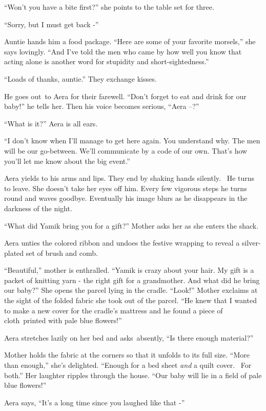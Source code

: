 \documentclass[twoside,11pt]{book}
\begin{document}
``Won't you have a bite first?'' she points to the table set for three. 

``Sorry, but I must get back -'' 

Auntie hands him a food package. ``Here are some of your favorite morsels,'' she says
lovingly. ``And I've told the men who came by how well you know that acting alone is another word for
stupidity and short-sightedness.'' 

``Loads of thanks, auntie.'' They exchange kisses. 

He goes out{\ }to Aera for their farewell. ``Don't forget to eat and drink for our
baby!'' he tells her. Then his voice becomes serious, ``Aera --?''

``What is it?'' Aera is all ears.

``I don't know when I'll manage to get here again. You understand why. The men will be our go-between.
We'll communicate by a code of our own. That's how you'll let me know about the big event.'' 

Aera yields to his arms and lips. They end by shaking hands silently. ~He turns to leave. She doesn't take her eyes off
him. Every few vigorous steps he turns round and waves goodbye. Eventually his image blurs as he disappears in the
darkness of the night. 

``What did Yamik bring you for a gift?'' Mother asks her as she enters the shack. 

Aera unties the colored ribbon and undoes the festive wrapping to reveal a silver-plated set of brush and comb.\ 

``Beautiful,'' mother is enthralled. ``Yamik is crazy about your hair. My gift is
a packet of knitting yarn - the right gift for a grandmother. And what did he bring our baby?'' She opens
the parcel lying in the cradle. ``Look!'' Mother exclaims at the sight of the folded fabric
she took out of the parcel. ``He knew that I wanted to make a new cover for the cradle's mattress and he
found a piece of cloth\ printed with pale blue flowers!'' 

Aera stretches lazily on her bed and asks~absently, ``Is there enough material?''

Mother holds the fabric at the corners so that it unfolds to its full size. ``More than
enough,'' she's delighted. ``Enough for a bed sheet \textit{and }a quilt cover. \ For
both.'' Her laughter ripples through the house. ``Our baby will lie in a field of pale blue
flowers!'' 

Aera says, ``It's a long time since you laughed like that -'' 
\end{document}

